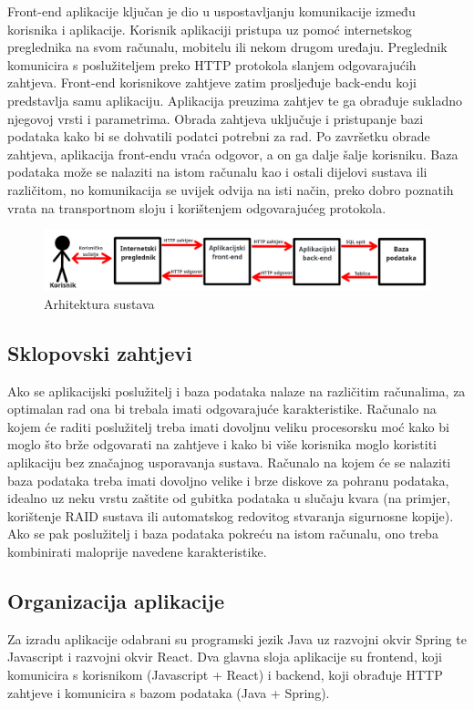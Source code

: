 				Front-end aplikacije ključan je dio u uspostavljanju komunikacije između korisnika i aplikacije. Korisnik aplikaciji pristupa uz pomoć internetskog preglednika na svom računalu, mobitelu ili nekom drugom uređaju. Preglednik komunicira s poslužiteljem preko HTTP protokola slanjem odgovarajućih zahtjeva. Front-end korisnikove zahtjeve zatim prosljeđuje back-endu koji predstavlja samu aplikaciju.
				\linebreak
				Aplikacija preuzima zahtjev te ga obrađuje sukladno njegovoj vrsti i parametrima. Obrada zahtjeva uključuje i pristupanje bazi podataka kako bi se dohvatili podatci potrebni za rad. Po završetku obrade zahtjeva, aplikacija front-endu vraća odgovor, a on ga dalje šalje korisniku.
				\linebreak
				Baza podataka može se nalaziti na istom računalu kao i ostali dijelovi sustava ili različitom, no komunikacija se uvijek odvija na isti način, preko dobro poznatih vrata na transportnom sloju i korištenjem odgovarajućeg protokola.
				\begin{figure}[H]
					\includegraphics[scale=0.85]{slike/skica_arhitekture.png}
					\centering
					\caption{Arhitektura sustava}
					\label{fig:arhitektura_sustava}
				\end{figure}
			\subsection{Sklopovski zahtjevi}
				Ako se aplikacijski poslužitelj i baza podataka nalaze na različitim računalima, za optimalan rad ona bi trebala imati odgovarajuće karakteristike. Računalo na kojem će raditi poslužitelj treba imati dovoljnu veliku procesorsku moć kako bi moglo što brže odgovarati na zahtjeve i kako bi više korisnika moglo koristiti aplikaciju bez značajnog usporavanja sustava. Računalo na kojem će se nalaziti baza podataka treba imati dovoljno velike i brze diskove za pohranu podataka, idealno uz neku vrstu zaštite od gubitka podataka u slučaju kvara (na primjer, korištenje RAID sustava ili automatskog redovitog stvaranja sigurnosne kopije). Ako se pak poslužitelj i baza podataka pokreću na istom računalu, ono treba kombinirati maloprije navedene karakteristike.
			\subsection{Organizacija aplikacije}
				Za izradu aplikacije odabrani su programski jezik Java uz razvojni okvir Spring te Javascript i razvojni okvir React. Dva glavna sloja aplikacije su frontend, koji komunicira s korisnikom (Javascript + React) i backend, koji obrađuje HTTP zahtjeve i komunicira s bazom podataka (Java + Spring).
				
